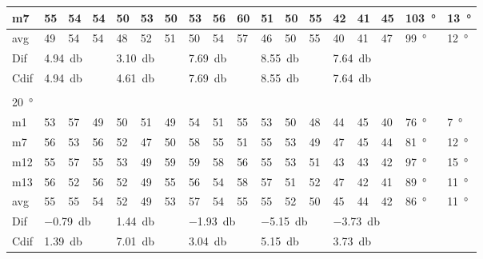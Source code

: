 \begin{table}[H]
\begin{tabular}{l|l|l|l|l|l|l|l|l|l|l|l|l|l|l|l|l|l}
m7    & 55     & 54     &  54    &   50   &   53   &  50    &  53    &  56     &  60    &  51     & 50     & 55     & 42 & 41 & 45   & \SI{103}{\degree} & \SI{13}{\degree}  \\ \hline
avg &  49    &  54    & 54     &  48    &  52    & 51     & 50     &   54    &   57   &  46     & 50     &  55    & 40 & 41  & 47    & \SI{99}{\degree} & \SI{12}{\degree}  \\ \hline  
Dif & \multicolumn{3}{l|}{\SI{4.94}{\decibel}} & \multicolumn{3}{l|}{\SI{3.10}{\decibel}} & \multicolumn{3}{l|}{\SI{7.69}{\decibel}} & \multicolumn{3}{l|}{\SI{8.55}{\decibel}} &  \multicolumn{3}{l|}{\SI{7.64}{\decibel}} & \multicolumn{2}{l}{} \\ \hline 
Cdif & \multicolumn{3}{l|}{\SI{4.94}{\decibel}} & \multicolumn{3}{l|}{\SI{4.61}{\decibel}} & \multicolumn{3}{l|}{\SI{7.69}{\decibel}} & \multicolumn{3}{l|}{\SI{8.55}{\decibel}} & \multicolumn{3}{l|}{\SI{7.64}{\decibel}}  &   \multicolumn{2}{l}{}   \\ 
 \multicolumn{18}{l}{ } \\                             
\SI{20}{\degree}   & \multicolumn{3}{l|}{} & \multicolumn{3}{l|}{} & \multicolumn{3}{l|}{} & \multicolumn{3}{l|}{} &  \multicolumn{3}{l|}{}   & \multicolumn{2}{l}{} \\  \hline
m1    &53      &  57    &  49    &   50   &  51    &  49    &  54    &   51    &  55    &    53   &  50    &  48    & 44 & 45 &40   & \SI{76}{\degree} & \SI{7}{\degree}   \\
m7    & 56     &  53    &  56    &   52   &  47    &   50   &   58   &   55    &  51    &    55   & 53     &  49    & 47 & 45 &44   & \SI{81}{\degree} & \SI{12}{\degree}   \\
m12  & 55     &  57    &  55    &  53    &  49    &   59   &   59   &   58    &   56   &   55    &  53    & 51     & 43 & 43 & 42   & \SI{97}{\degree} & \SI{15}{\degree}  \\
m13  &  56    &  52    &  56    &  52    &  49    &   55   &   56   &   54    &  58    &   57    &  51    &  52    & 47 & 42 & 41   & \SI{89}{\degree} & \SI{11}{\degree}  \\ \hline
avg &  55    & 55     &   54   &  52    & 49     &  53    &  57    &  54     &  55    &  55     &   52   & 50     & 45 & 44  &42   & \SI{86}{\degree} & \SI{11}{\degree}   \\ \hline  
Dif & \multicolumn{3}{l|}{\SI{-0.79}{\decibel}} & \multicolumn{3}{l|}{\SI{1.44}{\decibel}} & \multicolumn{3}{l|}{\SI{-1.93}{\decibel}} & \multicolumn{3}{l|}{\SI{-5.15}{\decibel}} &  \multicolumn{3}{l|}{\SI{-3.73}{\decibel}}      & \multicolumn{2}{l}{}   \\  \hline 
Cdif & \multicolumn{3}{l|}{\SI{1.39}{\decibel}} & \multicolumn{3}{l|}{\SI{7.01}{\decibel}} & \multicolumn{3}{l|}{\SI{3.04}{\decibel}} & \multicolumn{3}{l|}{\SI{5.15}{\decibel}} & \multicolumn{3}{l|}{\SI{3.73}{\decibel}}  &   \multicolumn{2}{l}{}   \\              
\end{tabular}
\label{meas:result_cross_9_10}
\end{table}



